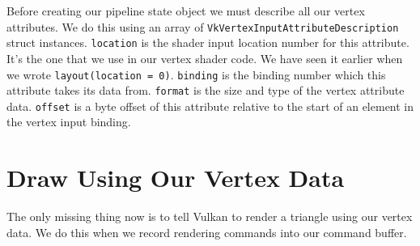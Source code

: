 Before creating our pipeline state object we must describe all our
vertex attributes.
We do this using an array of \texttt{VkVertexInputAttributeDescription} struct
instances.
\texttt{location} is the shader input location number for this attribute.
It's the one that we use in our vertex shader code.
We have seen it earlier when we wrote \texttt{layout(location = 0)}.
\texttt{binding} is the binding number which this attribute takes its data from.
\texttt{format} is the size and type of the vertex attribute data.
\texttt{offset} is a byte offset of this attribute relative to the start of
an element in the vertex input binding.

\begin{minipage}{\linewidth}{\noindent}
    
\end{minipage}

\section{Draw Using Our Vertex Data}

The only missing thing now is to tell Vulkan to render a triangle using our
vertex data.
We do this when we record rendering commands into our command buffer.

\begin{minipage}{\linewidth}{\noindent}
    
\end{minipage}
